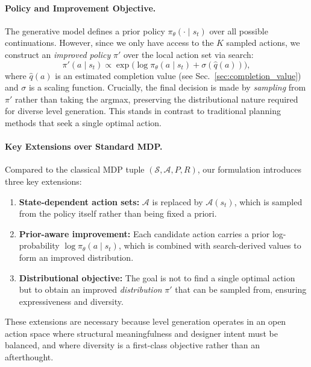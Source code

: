 \documentclass[11pt,a4paper]{article}
\begin{document}
\paragraph{Policy and Improvement Objective.}
The generative model defines a prior policy \(\pi_\theta(\cdot \mid s_t)\) over all possible continuations. However, since we only have access to the \(K\) sampled actions, we construct an \emph{improved policy} \(\pi'\) over the local action set via search:
\begin{equation}
    \pi'(a \mid s_t) \propto \exp\!\bigl( \log \pi_\theta(a \mid s_t) + \sigma(\hat{q}(a)) \bigr),
    \label{eq:improved_policy}
\end{equation}
where \(\hat{q}(a)\) is an estimated completion value (see Sec.~\ref{sec:completion_value}) and \(\sigma\) is a scaling function. Crucially, the final decision is made by \emph{sampling} from \(\pi'\) rather than taking the argmax, preserving the distributional nature required for diverse level generation. This stands in contrast to traditional planning methods that seek a single optimal action.

\paragraph{Key Extensions over Standard MDP.}
Compared to the classical MDP tuple \((\mathcal{S}, \mathcal{A}, P, R)\), our formulation introduces three key extensions:
\begin{enumerate}
    \item \textbf{State-dependent action sets:} \(\mathcal{A}\) is replaced by \(\mathcal{A}(s_t)\), which is sampled from the policy itself rather than being fixed a priori.
    \item \textbf{Prior-aware improvement:} Each candidate action carries a prior log-probability \(\log \pi_\theta(a \mid s_t)\), which is combined with search-derived values to form an improved distribution.
    \item \textbf{Distributional objective:} The goal is not to find a single optimal action but to obtain an improved \emph{distribution} \(\pi'\) that can be sampled from, ensuring expressiveness and diversity.
\end{enumerate}
These extensions are necessary because level generation operates in an open action space where structural meaningfulness and designer intent must be balanced, and where diversity is a first-class objective rather than an afterthought.
\end{document}
